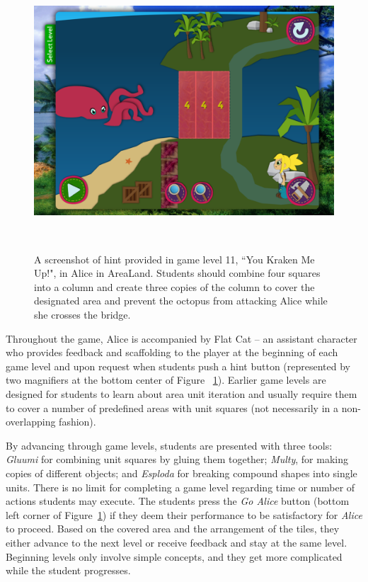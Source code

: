 \documentclass{sigchi}
\begin{document}
	\begin{figure}
		\centering
		\includegraphics[width=0.9\columnwidth]{figures/kracken}
		\caption{A screenshot of hint provided in game level 11, ``You Kraken Me Up!", in Alice in AreaLand. Students should combine four squares into a column and create three copies of the column to cover the designated area and prevent the octopus from attacking Alice while she crosses the bridge.}~\label{fig:figurekracken}
	\end{figure}
	
	Throughout the game,  Alice is accompanied by Flat Cat -- an assistant character who provides feedback and scaffolding to the player at the beginning of each game level and upon request when students push a hint button (represented by two magnifiers at the bottom center of Figure ~\ref{fig:figurekracken}).
	Earlier game levels are designed for students to learn about area unit iteration and usually require them to cover a number of predefined areas with unit squares (not necessarily in a non-overlapping fashion).
	 
	By advancing through game levels, students are presented with three tools: \textit {Gluumi} for combining unit squares by gluing them together; \textit {Multy}, for making copies of different objects; and \textit {Esploda} for breaking compound shapes into single units.  
	There is no limit for completing a game level regarding time or number of actions students may execute. 
	The students press the \textit {Go Alice} button (bottom left corner of Figure~\ref{fig:figurekracken}) if they deem their performance to be satisfactory for \textit {Alice} to proceed. 
	Based on the covered area and the arrangement of the tiles, they either advance to the next level or receive feedback and stay at the same level.
	Beginning levels only involve simple concepts, and they get more complicated while the student progresses.
	
\end{document}
